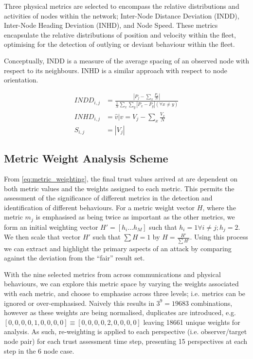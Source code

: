 \documentclass{aamas2016}
\begin{document}
Three physical metrics are selected to encompass the relative distributions and activities of nodes within the network; Inter-Node Distance Deviation (INDD), Inter-Node Heading Deviation (INHD), and Node Speed. These metrics encapsulate the relative distributions of position and velocity within the fleet, optimising for the detection of outlying or deviant behaviour within the fleet.

Conceptually, INDD is a measure of the average spacing of an observed node with respect to its neighbours. INHD is a similar approach with respect to node orientation.

\begin{align}
	INDD_{i,j} &= \frac{|P_j - \sum_x \frac{P_x}{N}|}{\frac{1}{N}\sum_x \sum_y{|P_x - P_y| (\forall x \neq y)}}\\
	INHD_{i,j} &= \hat{v} \vert v= V_j - \sum_x{\frac{V_x}{N}}\\
	S_{i,j} &= |V_j|
\end{align}

\subsection{Metric Weight Analysis Scheme}

From \eqref{eq:metric_weighting}, the final trust values arrived at are dependent on both metric values and the weights assigned to each metric. This permits the assessment of the significance of different metrics in the detection and identification of different behaviours. 
For a metric weight vector $H$, where the metric $m_j$ is emphasised as being twice as important as the other metrics, we form an initial weighting vector $H'=[h_i...h_M]$ such that $h_i = 1 \forall i \ne j; h_j=2$. We then scale that vector $H'$ such that $\sum H = 1$ by $H= \frac{H'}{\sum H'}$.
Using this process we can extract and highlight the primary aspects of an attack by comparing against the deviation from the ``fair'' result set.

With the nine selected metrics from across communications and physical behaviours, we can explore this metric space by varying the weights associated with each metric, and choose to emphasise across three levels; i.e. metrics can be ignored or over-emphasised. Naively this results in $3^9 = 19683$ combinations, however as these weights are being normalised, duplicates are introduced, e.g. $[0,0,0,0,1,0,0,0,0] \equiv [0,0,0,0,2,0,0,0,0]$ leaving 18661 unique weights for analysis.
As such, re-weighting is applied to each perspective (i.e. observer/target node pair) for each trust assessment time step, presenting 15 perspectives at each step in the 6 node case.
\end{document}
